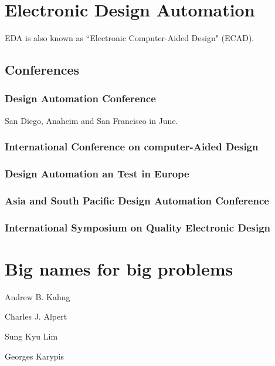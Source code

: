\documentclass[12pt,a4paper]{article}
\theoremstyle{customdef}
\begin{document}
\section{Electronic Design Automation}
EDA is also known as ``Electronic Computer-Aided Design" (ECAD).

\subsection{Conferences}
\subsubsection{Design Automation Conference}
San Diego, Anaheim and San Francisco in June.
\subsubsection{International Conference on computer-Aided Design}
\subsubsection{Design Automation an Test in Europe}
\subsubsection{Asia and South Pacific Design Automation Conference}
\subsubsection{International Symposium on Quality Electronic Design}









\section{Big names for big problems}

\begin{description}

	\item{Andrew B. Kahng}

	\item{Charles J. Alpert}

	\item{Sung Kyu Lim}

	\item{Georges Karypis}
\end{description}

\newpage

\glsaddall
\printglossaries

\newpage

% 

\end{document}
